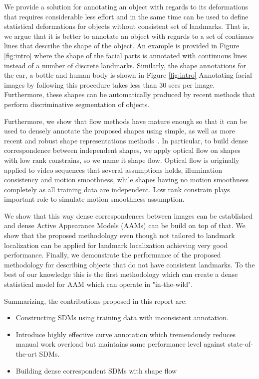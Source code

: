 We provide a solution for annotating an object with regards to its deformations that requires considerable less effort and in the same time can be used to define statistical deformations for objects without consistent set of landmarks. That is, we argue that it is better to annotate an object with regards to a set of continues lines that describe the shape of the object. An example is provided in Figure \ref{fig:intro} where the shape of the facial parts is annotated with continuous lines instead of a number of discrete landmarks. Similarly, the shape annotations for the ear, a bottle and human body is shown in Figure \ref{fig:intro} Annotating facial images by following this procedure takes less than 30 secs per image. Furthermore, these shapes can be automatically produced by recent methods that perform discriminative segmentation of objects. 

Furthermore, we show that flow methods have mature enough so that it can be used to densely annotate the proposed shapes using simple, as well as more recent and robust shape representations methods~\cite{Garg2013,Nguyen2013}.  In particular, to build dense correspondence between independent shapes, we apply optical flow on shapes with low rank constrains, so we name it shape flow. Optical flow is originally applied to video sequences that several assumptions holds, illumination consistency and motion smoothness, while shapes having no motion smoothness completely as all training data are independent. Low rank constrain plays important role to simulate motion smoothness assumption. 

We show that this way dense correspondences between images can be established and dense Active Appearance Models (AAMs) can be build on top of that. We show that the proposed methodology even though not tailored to landmark localization can be applied for landmark localization achieving very good performance. Finally, we demonstrate the performance of the proposed methodology for describing objects that do not have consistent landmarks. To the best of our knowledge this is the first methodology which can create a dense statistical model for AAM which can operate in "in-the-wild".

Summarizing, the contributions proposed in this report are:
\begin{itemize}
  \item Constructing SDMs using training data with inconsistent annotation.
  \item Introduce highly effective curve annotation which tremendously reduces manual work overload but maintains same performance level against state-of-the-art SDMs.
  \item Building dense correspondent SDMs with shape flow
\end{itemize}


